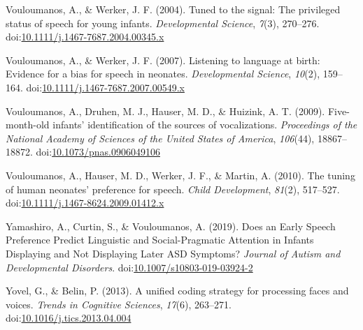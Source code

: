 \documentclass[man]{apa6}
\begin{document}
\hypertarget{ref-vouloumanos_tuned_2004}{}
Vouloumanos, A., \& Werker, J. F. (2004). Tuned to the signal: The
privileged status of speech for young infants. \emph{Developmental
Science}, \emph{7}(3), 270--276.
doi:\href{https://doi.org/10.1111/j.1467-7687.2004.00345.x}{10.1111/j.1467-7687.2004.00345.x}

\hypertarget{ref-vouloumanos_listening_2007}{}
Vouloumanos, A., \& Werker, J. F. (2007). Listening to language at
birth: Evidence for a bias for speech in neonates. \emph{Developmental
Science}, \emph{10}(2), 159--164.
doi:\href{https://doi.org/10.1111/j.1467-7687.2007.00549.x}{10.1111/j.1467-7687.2007.00549.x}

\hypertarget{ref-vouloumanos_five-month-old_2009}{}
Vouloumanos, A., Druhen, M. J., Hauser, M. D., \& Huizink, A. T. (2009).
Five-month-old infants' identification of the sources of vocalizations.
\emph{Proceedings of the National Academy of Sciences of the United
States of America}, \emph{106}(44), 18867--18872.
doi:\href{https://doi.org/10.1073/pnas.0906049106}{10.1073/pnas.0906049106}

\hypertarget{ref-vouloumanos_tuning_2010}{}
Vouloumanos, A., Hauser, M. D., Werker, J. F., \& Martin, A. (2010). The
tuning of human neonates' preference for speech. \emph{Child
Development}, \emph{81}(2), 517--527.
doi:\href{https://doi.org/10.1111/j.1467-8624.2009.01412.x}{10.1111/j.1467-8624.2009.01412.x}

\hypertarget{ref-yamashiro_does_2019}{}
Yamashiro, A., Curtin, S., \& Vouloumanos, A. (2019). Does an Early
Speech Preference Predict Linguistic and Social-Pragmatic Attention in
Infants Displaying and Not Displaying Later ASD Symptoms? \emph{Journal
of Autism and Developmental Disorders}.
doi:\href{https://doi.org/10.1007/s10803-019-03924-2}{10.1007/s10803-019-03924-2}

\hypertarget{ref-yovel_unified_2013}{}
Yovel, G., \& Belin, P. (2013). A unified coding strategy for processing
faces and voices. \emph{Trends in Cognitive Sciences}, \emph{17}(6),
263--271.
doi:\href{https://doi.org/10.1016/j.tics.2013.04.004}{10.1016/j.tics.2013.04.004}

\endgroup
\end{document}
